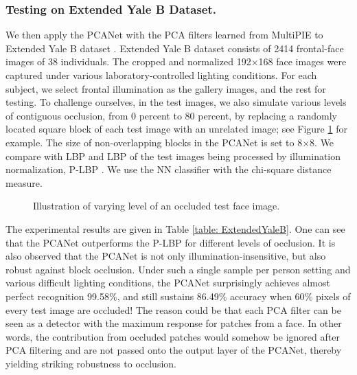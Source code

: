 \documentclass[10pt,journal,compsoc]{IEEEtran}
\begin{document}
\subsubsection{Testing on Extended Yale B Dataset.}\label{sec: ExtendedYaleB}
We then apply the PCANet with the PCA filters learned from MultiPIE to Extended Yale B dataset \cite{Georghiades2001}. Extended Yale B dataset consists of 2414 frontal-face images of 38 individuals. The cropped and normalized 192$\times$168 face images were captured under various laboratory-controlled lighting conditions. For each subject, we select frontal illumination as the gallery images, and the rest for testing. To challenge ourselves, in the test images, we also simulate various levels of contiguous occlusion, from 0 percent to 80 percent, by replacing a randomly located square block of each test image with an unrelated image; see Figure \ref{fig: EYaleB_occlusion} for example. The size of non-overlapping blocks in the PCANet is set to 8$\times$8. We compare with LBP \cite{Ahonen2006} and LBP of the test images being processed by illumination normalization, P-LBP \cite{Tan2010}. We use the NN classifier with the chi-square distance measure.


\begin{figure}[t]
\centering
{}
\caption{Illustration of varying level of an occluded test face image.}\label{fig: EYaleB_occlusion}
\end{figure}


The experimental results are given in Table \ref{table: ExtendedYaleB}. One can see that the PCANet outperforms the P-LBP for different levels of occlusion. It is also observed that the PCANet is not only illumination-insensitive, but also robust against block occlusion. Under such a single sample per person setting and various difficult lighting conditions, the PCANet surprisingly achieves almost perfect recognition 99.58$\%$, and still sustains 86.49$\%$ accuracy when 60$\%$ pixels of every test image are occluded! The reason could be that each PCA filter can be seen as a detector with the maximum response for patches from a face. In other words, the contribution from occluded patches would somehow be ignored after PCA filtering and are not passed onto the output layer of the PCANet, thereby yielding striking robustness to occlusion.
\end{document}
